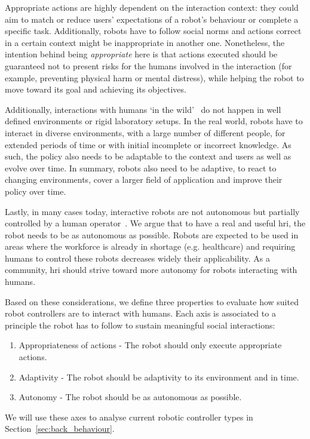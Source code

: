     Appropriate actions are highly dependent on the interaction context: they could aim to match or reduce users' expectations of a robot's behaviour or complete a specific task. Additionally, robots have to follow social norms and actions correct in a certain context might be inappropriate in another one. Nonetheless, the intention behind being \textit{appropriate} here is that actions executed should be guaranteed not to present risks for the humans involved in the interaction (for example, preventing physical harm or mental distress), while helping the robot to move toward its goal and achieving its objectives.

    Additionally, interactions with humans `in the wild'~\citep{belpaeme2012multimodal} do not happen in well defined environments or rigid laboratory setups. In the real world, robots have to interact in diverse environments, with a large number of different people, for extended periods of time or with initial incomplete or incorrect knowledge. As such, the policy also needs to be adaptable to the context and users as well as evolve over time. In summary, robots also need to be adaptive, to react to changing environments, cover a larger field of application and improve their policy over time.

    Lastly, in many cases today, interactive robots are not autonomous but partially controlled by a human operator~\citep{riek2012wizard}. We argue that to have a real and useful \gls{hri}, the robot needs to be as autonomous as possible. %
    Robots are expected to be used in areas where the workforce is already in shortage (e.g. healthcare) and requiring humans to control these robots decreases widely their applicability. As a community, \gls{hri} should strive toward more autonomy for robots interacting with humans.
    
    Based on these considerations, we define three properties to evaluate how suited robot controllers are to interact with humans. Each axis is associated to a principle the robot has to follow to sustain meaningful social interactions:
    \begin{enumerate}
    	\item Appropriateness of actions - The robot should only execute appropriate actions.
    	\item Adaptivity - The robot should be adaptivity to its environment and in time.
    	\item Autonomy - The robot should be as autonomous as possible.
    \end{enumerate}
    We will use these axes to analyse current robotic controller types in Section~\ref{sec:back_behaviour}.    
    
